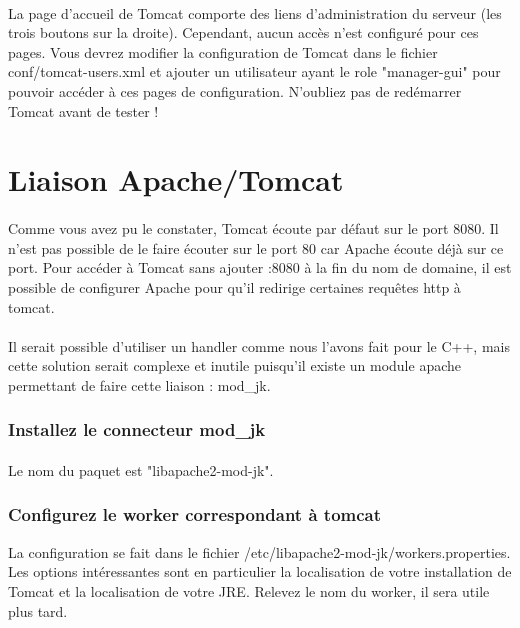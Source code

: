 \documentclass[12pt,a4paper]{article}
\begin{document}
\paragraph{}
La page d'accueil de Tomcat comporte des liens d'administration du serveur (les trois boutons sur la droite). Cependant, aucun accès n'est configuré pour ces pages. Vous devrez modifier la configuration de Tomcat dans le fichier conf/tomcat-users.xml et ajouter un utilisateur ayant le role "manager-gui" pour pouvoir accéder à ces pages de configuration. N'oubliez pas de redémarrer Tomcat avant de tester !

\section{Liaison Apache/Tomcat}

\paragraph{}
Comme vous avez pu le constater, Tomcat écoute par défaut sur le port 8080. Il n'est pas possible de le faire écouter sur le port 80 car Apache écoute déjà sur ce port. Pour accéder à Tomcat sans ajouter :8080 à la fin du nom de domaine, il est possible de configurer Apache pour qu'il redirige certaines requêtes http à tomcat.

\paragraph{}
Il serait possible d'utiliser un handler comme nous l'avons fait pour le C++, mais cette solution serait complexe et inutile puisqu'il existe un module apache permettant de faire cette liaison : mod\_jk.

\subsubsection{Installez le connecteur mod\_jk}
\paragraph{}
Le nom du paquet est "libapache2-mod-jk". 

\subsubsection{Configurez le worker correspondant à tomcat}
La configuration se fait dans le fichier /etc/libapache2-mod-jk/workers.properties. Les options intéressantes sont en particulier la localisation de votre installation de Tomcat et la localisation de votre JRE. Relevez le nom du worker, il sera utile plus tard.
\end{document}
